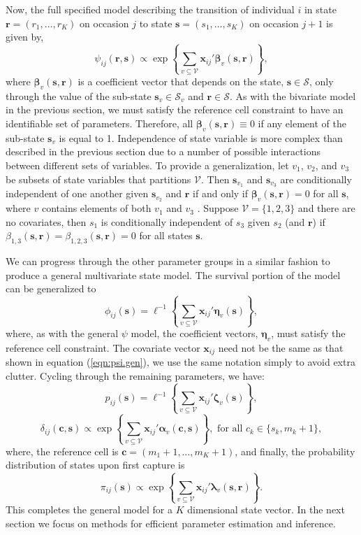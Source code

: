 \documentclass[fleqn]{article}
\newcommand{\bs}{\ensuremath{\mathbf{s}}}
\newcommand{\bc}{\ensuremath{\mathbf{c}}}
\newcommand{\fS}{\ensuremath{\mathcal{S}}}
\newcommand{\br}{\ensuremath{\mathbf{r}}}
\newcommand{\fV}{\ensuremath{\mathcal{V}}}
\newcommand{\bx}{\ensuremath{\mathbf{x}}}
\newcommand{\bb}{\ensuremath{\boldsymbol{\beta}}}
\newcommand{\ba}{\ensuremath{\boldsymbol{\alpha}}}
\newcommand{\bl}{\ensuremath{\boldsymbol{\lambda}}}
\newcommand{\bn}{\ensuremath{\boldsymbol{\eta}}}
\newcommand{\bz}{\ensuremath{\boldsymbol{\zeta}}}
\begin{document}
Now, the full specified model describing the transition of individual $i$ in state $\br = (r_1,\dots,r_K)$ on occasion $j$ to state $\bs=(s_1,\dots,s_K)$ on occasion $j+1$ is given by,
\begin{equation}
\label{eqn:psi.gen}
\psi_{ij}(\br,\bs) \propto \exp\left\{ \sum_{v\subseteq\fV}\bx_{ij}'\bb_v(\bs,\br)\right\},
\end{equation}
where $\bb_v(\bs,\br)$ is a coefficient vector that depends on the state, $\bs\in\fS$, only through the value of the sub-state $\bs_v\in\fS_v$ and $\br\in\fS$. As with the bivariate model in the previous section, we must satisfy the reference cell constraint to have an identifiable set of parameters. Therefore, all $\bb_v(\bs,\br) \equiv 0$ if any element of the sub-state $\bs_v$ is equal to 1. Independence of state variable is more complex than described in the previous section due to a number of possible interactions between different sets of variables. To provide a generalization, let $v_1$, $v_2$, and $v_3$ be subsets of state variables that partitions $\fV$. Then $\bs_{v_1}$ and $\bs_{v_3}$ are conditionally independent of one another given $\bs_{v_2}$ and $\br$ if and only if $\bb_v(\bs,\br) = 0$ for all $\bs$, where $v$ contains elements of both $v_1$ and $v_3$ \citep{Johnson:2003bh}. Suppose $\fV=\{1,2,3\}$ and there are no covariates, then $s_1$ is conditionally independent of $s_3$ given $s_2$ (and $\br$) if $\beta_{1,3}(\bs,\br) = \beta_{1,2,3}(\bs,\br)=0$ for all states $\bs$. 

We can progress through the other parameter groups in a similar fashion to produce a general multivariate state model. The survival portion of the model can be generalized to 
\begin{equation}
\phi_{ij}(\bs) = \ell^{-1}\left\{ \sum_{v\subseteq\fV}\bx_{ij}'\bn_v(\bs)\right\},
\end{equation}
where, as with the general $\psi$ model, the coefficient vectors, $\bn_v$, must satisfy the reference cell constraint. The covariate vector $\bx_{ij}$ need not be the same as that shown in equation (\ref{eqn:psi.gen}), we use the same notation simply to avoid extra clutter. Cycling through the remaining parameters, we have:
\begin{equation}
p_{ij}(\bs) = \ell^{-1}\left\{ \sum_{v\subseteq\fV}\bx_{ij}'\bz_v(\bs)\right\},
\end{equation}
\begin{equation}
\delta_{ij}(\bc,\bs) \propto \exp\left\{ \sum_{v\subseteq\fV}\bx_{ij}'\ba_v(\bc,\bs)\right\}, \mbox{ for all } c_k\in\{s_k,m_k+1\},
\end{equation}
where, the reference cell is $\bc=(m_1+1,\dots,m_K+1)$, and finally, the probability distribution of states upon first capture is
\begin{equation}
\pi_{ij}(\bs)\propto \exp\left\{ \sum_{v\subseteq\fV}\bx_{ij}'\bl_v(\bs,\br)\right\}.
\end{equation}  
This completes the general model for a $K$ dimensional state vector. In the next section we focus on methods for efficient parameter estimation and inference. 
 
\end{document}
